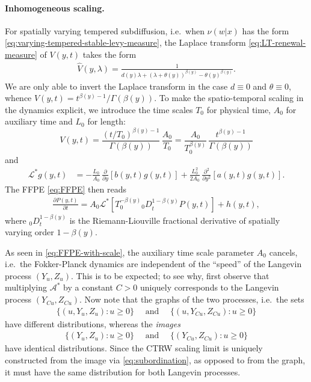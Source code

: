 \documentclass[a4paper,12pt]{article}
\numberwithin{equation}{section}
\theoremstyle{plain}
\theoremstyle{definition}
\theoremstyle{remark}
\numberwithin{equation}{section}
\newcommand{\1}{\mathbf 1}
\newcommand{\del}{\partial}
\begin{document}
\paragraph{Inhomogeneous scaling.}
For spatially varying tempered subdiffusion, i.e.\ when $\nu(w|x)$ has the form 
\eqref{eq:varying-tempered-stable-levy-measure}, 
the Laplace transform \eqref{eq:LT-renewal-measure} of $V(y,t)$ takes the form
\begin{align}
\hat V(y,\lambda) =
\frac{1}{d(y) \lambda + (\lambda + \theta(y))^{\beta(y)} - \theta(y)^{\beta(y)}}.
\end{align}
We are only able to invert the Laplace transform in the case $d \equiv 0$ and
$\theta \equiv 0$, whence $V(y,t) = t^{\beta(y)-1} / \Gamma(\beta(y))$.
To make the spatio-temporal scaling in the dynamics explicit, we introduce the time scales
$T_0$ for physical time, $A_0$ for auxiliary time and $L_0$ for length:
$$V(y,t) = \frac{(t/T_0)^{\beta(y)-1}}{\Gamma(\beta(y))}\, \frac{A_0}{T_0}
= \frac{A_0}{T_0^{\beta(y)}} \, \frac{t^{\beta(y) - 1}}{\Gamma(\beta(y))}$$
and
\begin{align}
\mathcal L^* g(y,t)
&= -\frac{L_0}{A_0}\,\frac{\partial }{\partial y}[b(y,t) g(y,t)]
+\frac{L_0^2}{2A_0}\,\frac{\partial^2 }{\partial y^2}[a(y,t) g(y,t)].
\end{align}
The FFPE \eqref{eq:FFPE} then reads
\begin{align} \label{eq:FFPE-with-scale}
\frac{\del P(y,t)}{\del t}
= A_0 \mathcal L^* \left[ T_0^{-\beta(y)} {_0 D}_t^{1-\beta(y)} P(y,t) \right] + h(y,t),
\end{align}
where $_0 D_t^{1-\beta(y)}$ is the Riemann-Liouville
fractional derivative of spatially varying order $1-\beta(y)$.

As seen in \eqref{eq:FFPE-with-scale}, the auxiliary time scale parameter $A_0$ cancels, i.e.\ the
Fokker-Planck dynamics are independent of the ``speed'' of the Langevin process
$(Y_u, Z_u)$.  This is to be expected; to see why, first observe that
multiplying $\mathcal A^*$ by a constant $C > 0$ uniquely corresponds to the
Langevin process $(Y_{Cu}, Z_{Cu})$. 
Now note that the graphs of the two processes, i.e.\ the sets
\begin{align*}
\{(u, Y_u, Z_u): u \ge 0\} \quad \text{ and } \quad 
\{(u, Y_{Cu}, Z_{Cu}): u \ge 0\}
\end{align*}
have different distributions, whereas the \emph{images}
\begin{align*}
\{(Y_u, Z_u): u \ge 0\} \quad \text{ and } \quad 
\{(Y_{Cu}, Z_{Cu}): u \ge 0\}
\end{align*}
have identical distributions. 
Since the CTRW scaling limit is uniquely constructed from the image via 
\eqref{eq:subordination},
as opposed to from the graph,
it must have the same distribution for both Langevin processes.
\end{document}

